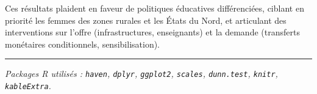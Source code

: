 \documentclass[
]{article}
\begin{document}
Ces résultats plaident en faveur de politiques éducatives différenciées,
ciblant en priorité les femmes des zones rurales et les États du Nord,
et articulant des interventions sur l'offre (infrastructures,
enseignants) et la demande (transferts monétaires conditionnels,
sensibilisation).

\begin{center}\rule{0.5\linewidth}{0.5pt}\end{center}

\emph{Packages R utilisés : \texttt{haven}, \texttt{dplyr},
\texttt{ggplot2}, \texttt{scales}, \texttt{dunn.test}, \texttt{knitr},
\texttt{kableExtra}.}
\end{document}
